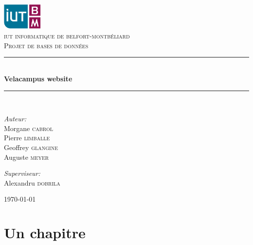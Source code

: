 \documentclass[11pt,a4paper,titlepage]{report}
\newcommand{\HRule}{\rule{\linewidth}{0.5mm}}
\begin{document}
\begin{titlepage}
\begin{center}

\includegraphics[width=0.15\textwidth]{logo.png}~
\\[1cm]
\textsc{\LARGE iut informatique de belfort-montbéliard}\\[1cm]

\textsc{\Large Projet de bases de données}\\[0.5cm]

\HRule \\[0.4cm]
{ \huge \bfseries Velacampus website \\[0.4cm] }

\HRule \\[1.5cm]

\begin{minipage}{0.4\textwidth}
\begin{flushleft} \large
\emph{Auteur:}\\
Morgane \textsc{cabrol}\\
Pierre \textsc{limballe}\\
Geoffrey \textsc{glangine}\\
Auguste \textsc{meyer}
\end{flushleft}
\end{minipage}
\begin{minipage}{0.4\textwidth}
\begin{flushright} \large
\emph{Superviseur:} \\
Alexandru  \textsc{dobrila}
\end{flushright}
\end{minipage}

\vfill

{\large \today}

\end{center}
\end{titlepage}

\tableofcontents

\chapter{Un chapitre}
\end{document}

